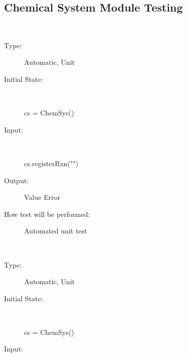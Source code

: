 \documentclass[12pt, titlepage]{article}
\newcounter{testnum} %
\begin{document}
\subsection{Chemical System Module Testing}
\begin{addmargin}[2em]{0em}



\\
\begin{addmargin}[2em]{0em}
\begin{description}
\item[Type:] Automatic, Unit
					
\item[Initial State:] ~\newline

\begin{python}
cs = ChemSys()
\end{python}
					
\item[Input:] ~\newline

\begin{python}
cs.registerRxn("") 
\end{python}
					
\item[Output:] Value Error
					
\item[How test will be performed:] Automated unit test\\
\end{description}
\end{addmargin}

\newpage
{}\\
\begin{addmargin}[2em]{0em}
\begin{description}
\item[Type:] Automatic, Unit
					
\item[Initial State:] ~\newline

\begin{python}
cs = ChemSys()
\end{python}
					
\item[Input:] ~\newline


\end{description}
\end{addmargin}
\end{addmargin}
\end{document}
